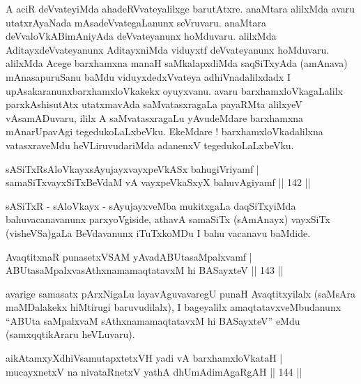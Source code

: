 \begin{artha}
A aciR deVvateyiMda ahadeRVvateyalilxge barutAtxre. anaMtara alilxMda avaru utatxrAyaNada mAsadeVvategaLanunx seVruvaru. anaMtara deVva\-\break loVkABimAniyAda deVvateyanunx hoMduvaru. alilxMda AditayxdeVvateyanunx AditayxniMda viduyxtf deVvateyanunx hoMduvaru. alilxMda Acege barxhamxna manaH saMkalapxdiMda saqSiTxyAda (amAnava) mAnasapuruSanu baMdu viduyxdedxVvateya adhiVnadalilxdadx I upAsakaranunxbarxhamxloVkakekx oyuyxvanu. avaru barxhamxloVkagaLalilx parxkAshisutAtx utatxmavAda saMvatasxragaLa payaRMta alilxyeV vAsamADuvaru, ililx A saMvatasxragaLu yAvudeMdare  barxhamxna mAnarUpavAgi tegedukoLaLxbeVku. EkeMdare ! barxhamxloVkadalilxna vatasxraveMdu heVLiruvudariMda adanenxV tegedukoLaLxbeVku.
\end{artha}


\begin{shl}
sASiTxRsAloVkayxsAyujayxvayxpeVkASx bahugiVriyamf | \\
samaSiTxvayxSiTxBeVdaM vA vayxpeVkaSxyX bahuvAgiyamf \hfill|| 142 || 
\end{shl}

\begin{artha}
sASiTxR - sAloVkayx - sAyujayxveMba mukitxgaLa daqSiTxyiMda
bahuvacanavanunx parxyoVgiside, athavA samaSiTx (sAmAnayx) vayxSiTx
(visheVSa)gaLa BeVdavanunx iTuTxkoMDu I bahu vacanavu baMdide.
\end{artha}


\begin{shl}
AvaqtitxnaR punasetxVSAM yAvadABUtasaMpalxvamf | \\
ABUtasaMpalxvasAthxnamamaqtatavxM hi BASayxteV \hfill|| 143 || 
\end{shl}

\begin{artha}
avarige samasatx pArxNigaLu layavAguvavaregU punaH Avaqtitxyilalx
(saMsAra maMDalakekx hiMtirugi baruvudilalx), I bageyalilx
amaqtatavxveMbudanunx ``ABUta saMpalxvaM sAthxnamamaqtatavxM
hi BASayxteV'' eMdu (samxqqtikAraru heVLuvaru).
\end{artha}


\begin{shl}
aikAtamxyXdhiVsamutapxtetxVH yadi vA barxhamxloVkataH | \\
mucayxnetxV na nivataRnetxV yathA dhUmAdimAgaRgAH \hfill|| 144 || 
\end{shl}

